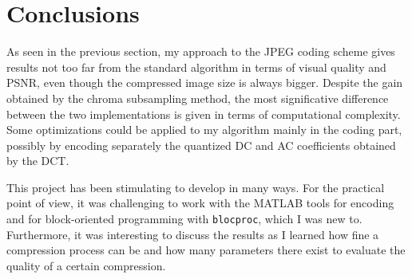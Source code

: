 \documentclass[14pt,a4paper]{extarticle}
\begin{document}
\section{Conclusions}
As seen in the previous section, my approach to the JPEG coding scheme gives results not too far from the standard algorithm in terms of visual quality and PSNR, even though the compressed image size is always bigger. Despite the gain obtained by the chroma subsampling method, the most significative difference between the two implementations is given in terms of computational complexity. Some optimizations could be applied to my algorithm mainly in the coding part, possibly by encoding separately the quantized DC and AC coefficients obtained by the DCT.

This project has been stimulating to develop in many ways. For the practical point of view, it was challenging to work with the MATLAB tools for encoding and for block-oriented programming with \texttt{blocproc}, which I was new to. Furthermore, it was interesting to discuss the results as I learned how fine a compression process can be and how many parameters there exist to evaluate the quality of a certain compression.
\end{document}
